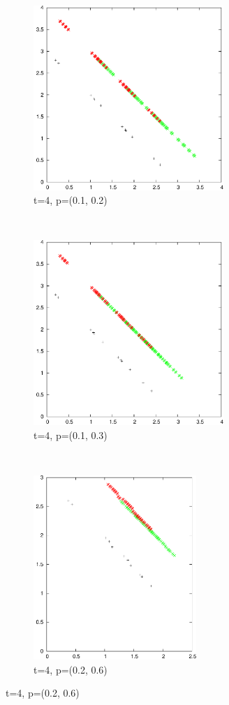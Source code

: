 \documentclass{article}
\begin{document}
	\begin{figure}
		\centering
		\begin{subfigure}[b]{0.30\textwidth}
			\centering
			\includegraphics[width=\textwidth,height=7cm,keepaspectratio]{images/t4_12}
			\caption{t=4, p=(0.1, 0.2)}
			\label{fig:t4_12}
		\end{subfigure}
		~
		\begin{subfigure}[b]{0.30\textwidth}
			\centering
			\includegraphics[width=\textwidth,height=7cm,keepaspectratio]{images/t4_13}
			\caption{t=4, p=(0.1, 0.3)}
			\label{fig:t4_13}
		\end{subfigure}
		~
		\begin{subfigure}[b]{0.30\textwidth}
			\centering
			\includegraphics[width=\textwidth,height=7cm,keepaspectratio]{images/t4_26}
			\caption{t=4, p=(0.2, 0.6)}
			\label{fig:t4_26}
		\end{subfigure}


\end{figure}
\end{document}
